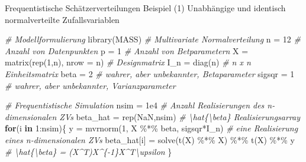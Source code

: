 \documentclass[
  8pt,
  ignorenonframetext,
]{beamer}
\newenvironment{Shaded}{\begin{snugshade}}{\end{snugshade}}
\newcommand{\AttributeTok}[1]{\textcolor[rgb]{0.77,0.63,0.00}{#1}}
\newcommand{\CommentTok}[1]{\textcolor[rgb]{0.56,0.35,0.01}{\textit{#1}}}
\newcommand{\ConstantTok}[1]{\textcolor[rgb]{0.00,0.00,0.00}{#1}}
\newcommand{\ControlFlowTok}[1]{\textcolor[rgb]{0.13,0.29,0.53}{\textbf{#1}}}
\newcommand{\DecValTok}[1]{\textcolor[rgb]{0.00,0.00,0.81}{#1}}
\newcommand{\FloatTok}[1]{\textcolor[rgb]{0.00,0.00,0.81}{#1}}
\newcommand{\FunctionTok}[1]{\textcolor[rgb]{0.00,0.00,0.00}{#1}}
\newcommand{\NormalTok}[1]{#1}
\newcommand{\OtherTok}[1]{\textcolor[rgb]{0.56,0.35,0.01}{#1}}
\newcommand{\SpecialCharTok}[1]{\textcolor[rgb]{0.00,0.00,0.00}{#1}}
\begin{document}
\begin{frame}[fragile]{Frequentistische Schätzerverteilungen}
\protect\hypertarget{frequentistische-schuxe4tzerverteilungen-3}{}
Beispiel (1) Unabhängige und identisch normalverteilte Zufallsvariablen
\vspace{2mm}

\footnotesize

\begin{Shaded}
\begin{Highlighting}[]
\CommentTok{\# Modellformulierung}
\FunctionTok{library}\NormalTok{(MASS)                                      }\CommentTok{\# Multivariate Normalverteilung  }
\NormalTok{n        }\OtherTok{=} \DecValTok{12}                                      \CommentTok{\# Anzahl von Datenpunkten}
\NormalTok{p        }\OtherTok{=} \DecValTok{1}                                       \CommentTok{\# Anzahl von Betparametern}
\NormalTok{X        }\OtherTok{=} \FunctionTok{matrix}\NormalTok{(}\FunctionTok{rep}\NormalTok{(}\DecValTok{1}\NormalTok{,n), }\AttributeTok{nrow =}\NormalTok{ n)              }\CommentTok{\# Designmatrix}
\NormalTok{I\_n      }\OtherTok{=} \FunctionTok{diag}\NormalTok{(n)                                 }\CommentTok{\# n x n Einheitsmatrix}
\NormalTok{beta     }\OtherTok{=} \DecValTok{2}                                       \CommentTok{\# wahrer, aber unbekannter, Betaparameter}
\NormalTok{sigsqr   }\OtherTok{=} \DecValTok{1}                                       \CommentTok{\# wahrer, aber unbekannter, Varianzparameter}

\CommentTok{\# Frequentistische Simulation}
\NormalTok{nsim     }\OtherTok{=} \FloatTok{1e4}                                     \CommentTok{\# Anzahl Realisierungen des n{-}dimensionalen ZVs}
\NormalTok{beta\_hat }\OtherTok{=} \FunctionTok{rep}\NormalTok{(}\ConstantTok{NaN}\NormalTok{,nsim)                           }\CommentTok{\# \textbackslash{}hat\{\textbackslash{}beta\} Realisierungsarray}
\ControlFlowTok{for}\NormalTok{(i }\ControlFlowTok{in} \DecValTok{1}\SpecialCharTok{:}\NormalTok{nsim)\{}
\NormalTok{  y           }\OtherTok{=} \FunctionTok{mvrnorm}\NormalTok{(}\DecValTok{1}\NormalTok{, X }\SpecialCharTok{\%*\%}\NormalTok{ beta, sigsqr}\SpecialCharTok{*}\NormalTok{I\_n) }\CommentTok{\# eine Realisierung eines n{-}dimensionalen ZVs}
\NormalTok{  beta\_hat[i] }\OtherTok{=} \FunctionTok{solve}\NormalTok{(}\FunctionTok{t}\NormalTok{(X) }\SpecialCharTok{\%*\%}\NormalTok{ X) }\SpecialCharTok{\%*\%} \FunctionTok{t}\NormalTok{(X) }\SpecialCharTok{\%*\%}\NormalTok{ y   }\CommentTok{\# \textbackslash{}hat\{\textbackslash{}beta\} = (X\^{}T)X\^{}\{{-}1\}X\^{}T\textbackslash{}upsilon}
\NormalTok{\}}
\end{Highlighting}
\end{Shaded}
\end{frame}
\end{document}
